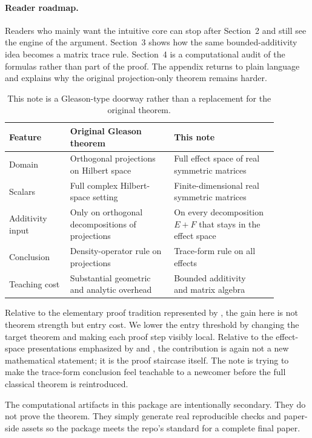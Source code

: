 \paragraph{Reader roadmap.}
Readers who mainly want the intuitive core can stop after Section~2 and still see the engine of the argument. Section~3 shows how the same bounded-additivity idea becomes a matrix trace rule. Section~4 is a computational audit of the formulas rather than part of the proof. The appendix returns to plain language and explains why the original projection-only theorem remains harder.

\begin{table}[t]
\centering
\small
\begin{tabular}{p{0.2\linewidth}p{0.34\linewidth}p{0.34\linewidth}}
\toprule
Feature & Original Gleason theorem & This note \\
\midrule
Domain & Orthogonal projections on Hilbert space & Full effect space of real symmetric matrices \\
Scalars & Full complex Hilbert-space setting & Finite-dimensional real symmetric matrices \\
Additivity input & Only on orthogonal decompositions of projections & On every decomposition $E+F$ that stays in the effect space \\
Conclusion & Density-operator rule on projections & Trace-form rule on all effects \\
Teaching cost & \shortstack[l]{Substantial geometric\\and analytic overhead} & \shortstack[l]{Bounded additivity\\and matrix algebra} \\
\bottomrule
\end{tabular}
\caption{This note is a Gleason-type doorway rather than a replacement for the original theorem.}
\label{tab:comparison}
\end{table}

Relative to the elementary proof tradition represented by \citet{cooke1985}, the gain here is not theorem strength but entry cost. We lower the entry threshold by changing the target theorem and making each proof step visibly local. Relative to the effect-space presentations emphasized by \citet{busch2003} and \citet{wright2019}, the contribution is again not a new mathematical statement; it is the proof staircase itself. The note is trying to make the trace-form conclusion feel teachable to a newcomer before the full classical theorem is reintroduced.

The computational artifacts in this package are intentionally secondary. They do not prove the theorem. They simply generate real reproducible checks and paper-side assets so the package meets the repo's standard for a complete final paper.
